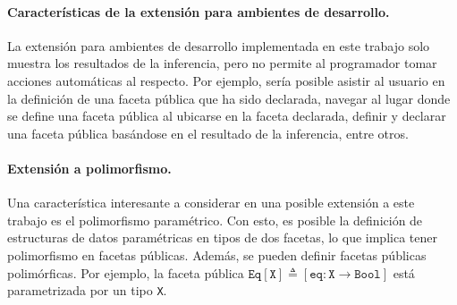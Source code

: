 \begin{conclusion}
	\paragraph{Características de la extensión para ambientes de desarrollo.}La extensión para ambientes de desarrollo implementada en este trabajo solo muestra los resultados de la inferencia, pero no permite al programador tomar acciones automáticas al respecto. Por ejemplo, sería posible asistir al usuario en la definición de una faceta pública que ha sido declarada, navegar al lugar donde se define una faceta pública al ubicarse en la faceta declarada, definir y declarar una faceta pública basándose en el resultado de la inferencia, entre otros.

	\paragraph{Extensión a polimorfismo.}Una característica interesante a considerar en una posible extensión a este trabajo es el polimorfismo paramétrico. Con esto, es posible la definición de estructuras de datos paramétricas en tipos de dos facetas, lo que implica tener polimorfismo en facetas públicas. Además, se pueden definir facetas públicas polimórficas. Por ejemplo, la faceta pública $\mathtt{Eq[X]}\triangleq [\mathtt{eq} : \mathtt{X} \rightarrow \mathtt{Bool}]$ está parametrizada por un tipo \texttt{X}.


\end{conclusion}
